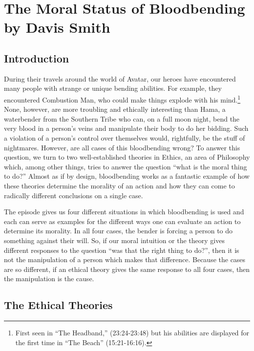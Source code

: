 \chapter{The Moral Status of Bloodbending by Davis Smith}
\label{bloodbending}
\section{Introduction}
\setcounter{fd}{\thefootnote}
\setcounter{footnote}{0}

During their travels around the world of Avatar, our heroes have encountered many people with strange or unique bending abilities. For example, they encountered Combustion Man, who could make things explode with his mind.\footnote{First seen in “The Headband,” (23:24-23:48) but his abilities are displayed for the first time in “The Beach” (15:21-16:16).} None, however, are more troubling and ethically interesting than Hama, a waterbender from the Southern Tribe who can, on a full moon night, bend the very blood in a person’s veins and manipulate their body to do her bidding.\autocite{puppetmaster} Such a violation of a person’s control over themselves would, rightfully, be the stuff of nightmares. However, are all cases of this bloodbending wrong? To answer this question, we turn to two well-established theories in Ethics, an area of Philosophy which, among other things, tries to answer the question “what is the moral thing to do?” Almost as if by design, bloodbending works as a fantastic example of how these theories determine the morality of an action and how they can come to radically different conclusions on a single case.

The episode gives us four different situations in which bloodbending is used and each can serve as examples for the different ways one can evaluate an action to determine its morality. In all four cases, the bender is forcing a person to do something against their will. So, if our moral intuition or the theory gives different responses to the question “was that the right thing to do?”, then it is not the manipulation of a person which makes that difference. Because the cases are so different, if an ethical theory gives the same response to all four cases, then the manipulation is the cause.

\section{The Ethical Theories}

